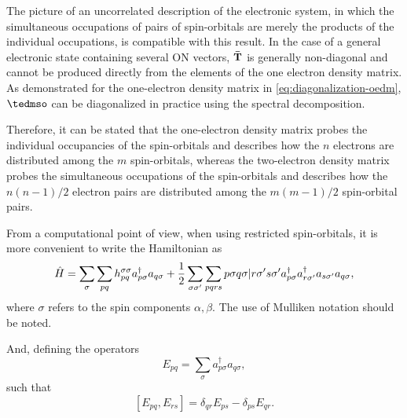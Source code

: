 The picture of an uncorrelated description of the electronic system, in which 
the simultaneous occupations of pairs of spin-orbitals are merely the products 
of the individual occupations, is compatible with this result.
In the case of a general electronic state containing several ON vectors, $\boldsymbol{\mathrm{\bar{T}}}$
is generally non-diagonal and cannot be produced directly from the elements of 
the one electron density matrix. As demonstrated for the one-electron density 
matrix in \cref{eq:diagonalization-oedm}, $ \mat{\tedmso}$ can be diagonalized
in practice using the spectral decomposition.

Therefore, it can be stated that the one-electron density matrix probes the
individual occupancies of the spin-orbitals and describes how the $n$ electrons
are distributed among the $m$ spin-orbitals, whereas the two-electron density
matrix probes the simultaneous occupations of the spin-orbitals and describes
how the $n\left( n-1 \right) /2$ electron pairs are distributed among the 
$m\left( m-1 \right) /2$ spin-orbital pairs.

From a computational point of view, when using restricted spin-orbitals, it is
more convenient to write the Hamiltonian as
\begin{equation} \label{eq:mol-elec-hamiltonian}
    \hat{H} =
    \sum_{\sigma} 
    \sum_{pq} h_{pq}^{\sigma \sigma} a_{p \sigma}^{\dagger} a_{q \sigma}
    +
    \frac{1}{2} \sum_{\sigma \sigma^{\prime}} \sum_{pqrs} 
    \PBraket{p\sigma q \sigma | r\sigma^{\prime} s \sigma^{\prime}}
    a_{p \sigma}^{\dagger} a_{r \sigma^{\prime}}^{\dagger} a_{s \sigma^{\prime}} a_{q \sigma}
    ,
\end{equation}
where $\sigma$ refers to the spin components $\alpha, \beta$.
The use of Mulliken notation should be noted.

And, defining the operators 
\begin{equation}
    E_{pq} =
    \sum_{\sigma} a_{p\sigma}^{\dagger} a_{q\sigma}
    ,
\end{equation}
such that 
\begin{equation}
    \left[ E_{pq}, E_{rs} \right] =
    \delta_{qr} E_{ps} - \delta_{ps} E_{qr}
    .
\end{equation}

